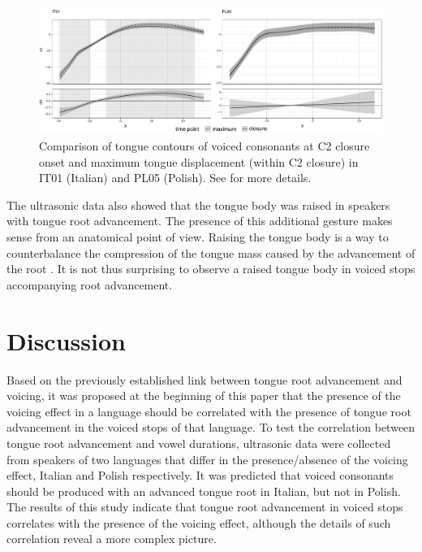 \documentclass[authoryear, twocolumn]{elsarticle}
\begin{document}
\begin{figure}
    \centering
    \includegraphics[width=.9\textwidth]{fig/voiced.pdf}
    \caption{Comparison of tongue contours of voiced consonants at C2 closure onset and maximum tongue displacement (within C2 closure) in IT01 (Italian) and PL05 (Polish). See  for more details.}
    \label{f:voiced}
\end{figure}

The ultrasonic data also showed that the tongue body was raised in
speakers with tongue root advancement. The presence of this additional
gesture makes sense from an anatomical point of view. Raising the tongue
body is a way to counterbalance the compression of the tongue mass
caused by the advancement of the root
\citep{perkell1969, jackson1988, sproat1993, kingston1997, fulop1998}.
It is not thus surprising to observe a raised tongue body in voiced
stops accompanying root advancement.

\section{Discussion}\label{discussion}

\label{s:discussion}

Based on the previously established link between tongue root advancement
and voicing, it was proposed at the beginning of this paper that the
presence of the voicing effect in a language should be correlated with
the presence of tongue root advancement in the voiced stops of that
language. To test the correlation between tongue root advancement and
vowel durations, ultrasonic data were collected from speakers of two
languages that differ in the presence/absence of the voicing effect,
Italian and Polish respectively. It was predicted that voiced consonants
should be produced with an advanced tongue root in Italian, but not in
Polish. The results of this study indicate that tongue root advancement
in voiced stops correlates with the presence of the voicing effect,
although the details of such correlation reveal a more complex picture.
\end{document}
